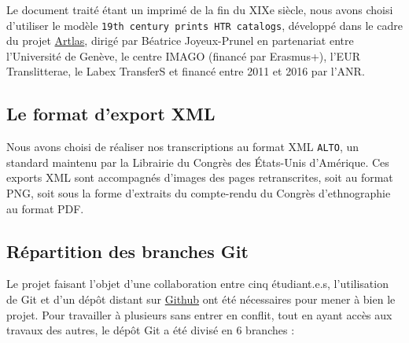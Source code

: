 \documentclass{article}
\begin{document}
	Le document traité étant un imprimé de la fin du XIXe siècle, nous avons choisi d'utiliser le modèle \texttt{19th century prints HTR catalogs}, développé dans le cadre du projet \href{https://artlas.huma-num.fr/fr/}{Artlas}, dirigé par Béatrice Joyeux-Prunel en partenariat entre l'Université de Genève, le centre IMAGO (financé par Erasmus+), l'EUR Translitterae, le Labex TransferS et financé entre 2011 et 2016 par l'ANR.
	
	
	\subsection{Le format d'export XML}
	
	Nous avons choisi de réaliser nos transcriptions au format XML \texttt{ALTO}, un standard maintenu par la Librairie du Congrès des États-Unis d'Amérique. Ces exports XML sont accompagnés d'images des pages retranscrites, soit au format PNG, soit sous la forme d'extraits du compte-rendu du Congrès d'ethnographie au format PDF.
 	
	\subsection{Répartition des branches Git}
	
	Le projet faisant l'objet d'une collaboration entre cinq étudiant.e.s, l'utilisation de Git et d'un dépôt distant sur \href{https://github.com/kat-kel/TNAH-2021-Expositions_Universelles/}{Github} ont été nécessaires pour mener à bien le projet. Pour travailler à plusieurs sans entrer en conflit, tout en ayant accès aux travaux des autres, le dépôt Git a été divisé en 6 branches :
	
\end{document}
